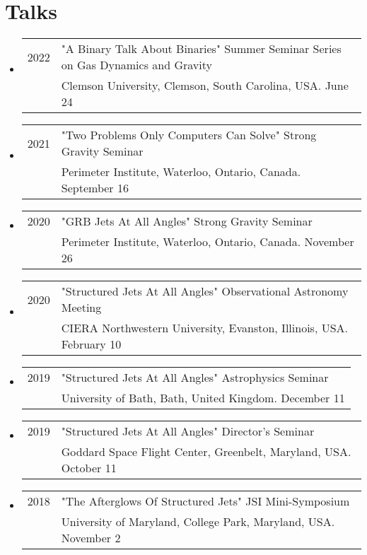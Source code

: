 \section*{Talks}
\begin{itemize}
\item \begin{tabular}{ll}
2022 & "A Binary Talk About Binaries" Summer Seminar Series on Gas Dynamics and Gravity  \\
	& Clemson University, Clemson, South Carolina, USA.  June 24
\end{tabular}
\item \begin{tabular}{ll}
2021 & "Two Problems Only Computers Can Solve" Strong Gravity Seminar  \\
	& Perimeter Institute, Waterloo, Ontario, Canada.  September 16
\end{tabular}
\item \begin{tabular}{ll}
2020 & "GRB Jets At All Angles" Strong Gravity Seminar  \\
	& Perimeter Institute, Waterloo, Ontario, Canada.  November 26
\end{tabular}
\item \begin{tabular}{ll}
2020 & "Structured Jets At All Angles" Observational Astronomy Meeting  \\
	& CIERA Northwestern University, Evanston, Illinois, USA.  February 10
\end{tabular}
\item \begin{tabular}{ll}
2019 & "Structured Jets At All Angles" Astrophysics Seminar  \\
	& University of Bath, Bath, United Kingdom.  December 11
\end{tabular}
\item \begin{tabular}{ll}
2019 & "Structured Jets At All Angles" Director's Seminar  \\
	& Goddard Space Flight Center, Greenbelt, Maryland, USA.  October 11
\end{tabular}

\item \begin{tabular}{ll}
2018 & "The Afterglows Of Structured Jets" JSI Mini-Symposium  \\
	& University of Maryland, College Park, Maryland, USA.  November 2
\end{tabular}


\end{itemize}
